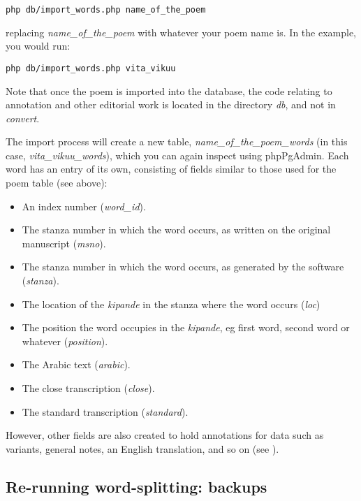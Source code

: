 \verb|php db/import_words.php name_of_the_poem|

replacing \textit{name_of_the_poem} with whatever your poem name is.  In the example, you would run:

\verb|php db/import_words.php vita_vikuu|

Note that once the poem is imported into the database, the code relating to annotation and other editorial work is located in the directory \textit{db}, and not in \textit{convert}.

The import process will create a new table, \textit{name_of_the_poem_words} (in this case, \textit{vita_vikuu_words}), which you can again inspect using phpPgAdmin.  Each word has an entry of its own, consisting of fields similar to those used for the poem table (see above):
\begin{itemize}
\item An index number (\textit{word_id}).
\item The stanza number in which the word occurs, as written on the original manuscript (\textit{msno}).
\item The stanza number in which the word occurs, as generated by the software (\textit{stanza}).
\item The location of the \textit{kipande} in the stanza where the word occurs (\textit{loc})
\item The position the word occupies in the \textit{kipande}, eg first word, second word or whatever (\textit{position}).
\item The Arabic text (\textit{arabic}).
\item The close transcription (\textit{close}).
\item The standard transcription (\textit{standard}).
\end{itemize}

However, other fields are also created to hold annotations for data such as variants, general notes, an English translation, and so on (see ).

\subsection{Re-running word-splitting: backups}
\label{ss:rerun}

